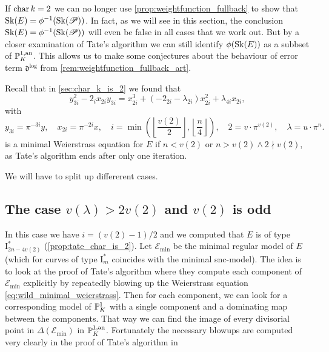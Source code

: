 If $\operatorname{char} k =2$ we can no longer use \cref{prop:weightfunction_fullback} to show that  $\sk(E) = \phi^{-1}(\sk(\mathscr P))$. 
In fact, as we will see in this section, the conclusion $\sk(E) = \phi^{-1}(\sk(\mathscr P))$ will even be false in all cases that we work out.  
But by a closer examination of Tate's algorithm we can still identify $\phi(\sk(E))$ as a subbset of $ \mathbb{P}_K^{1, \text{an}}$. 
This allows us to make some conjectures about the behaviour of error term $\mathfrak{d} ^{\text{log}}$ from \cref{rem:weightfunction_fullback_art}. 


Recall that in \cref{sec:char_k_is_2} we found that \begin{equation}\label{eq:wild_minimal_weierstrass}
y_{3i}^2 - 2_i x_{2i} y_{3i} = x_{2i}^3 + (-2_{2i} - \lambda_{2i}) x_{2i}^2 + \lambda_{4i} x_{2i}
,\end{equation} 
with \[
	y_{3i} = \pi^{-3i} y,\quad x_{2i} = \pi^{-2i} x, \quad i = \min\left( \left\lfloor \frac{v(2)}{2}\right\rfloor, \left\lfloor \frac{n}{4} \right\rfloor  \right), \quad 2 = v\cdot \pi^{v(2)},\quad  \lambda = u \cdot \pi^{n}
.\] 
is a minimal Weierstrass equation for $E$ if $n < v(2)$ or $n > v(2) \wedge 2 \nmid v(2)$, as Tate's algorithm ends after only one iteration. 

We will have to split up differerent cases. 
\subsection{The case $v(\lambda) > 2v(2)$ and $v(2)$ is odd} \label{sec:case_v_lambda_>_2_v_2_and_v_2_is_even}
In this case we have $i = (v(2) - 1) / 2$ and we computed that $E$ is of type $\mathrm I_{2n - 4v(2)}^*$ (\cref{prop:tate_char_is_2}).
Let $\mathscr E_\text{min} $ be the minimal regular model of $E$ (which for curves of type $\mathrm I_m^*$ coincides with the minimal snc-model).
The idea is to look at the proof of Tate's algorithm where they compute each component of $\mathscr E_\text{min} $ explicitly by repeatedly blowing up the Weierstrass equation \eqref{eq:wild_minimal_weierstrass}. 
Then for each component, we can look for a corresponding model of $\mathbb{P}^{1}_K$ with a single component and a dominating map between the components. 
That way we can find the image of every divisorial point in $\Delta(\mathscr E_\text{min} )$ in $\mathbb{P}^{1, \text{an}}_K$. 
Fortunately the necessary blowups are computed very clearly in the proof of Tate's algorithm in \cite[p.\ 369-379]{silvermanAdvancedTopicsArithmetic1994}

